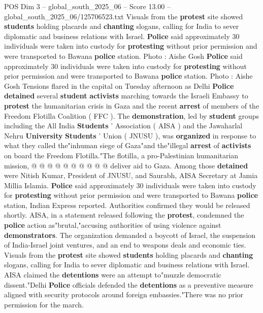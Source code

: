 \begin{textsample}{POS Dim 3 – global\_south\_2025\_06 – Score 13.00 – global\_south\_2025\_06/125706523.txt}  \label{ex:f3_pos_207}
Visuals from the \textbf{protest} site showed \textbf{students} holding placards and \textbf{chanting} slogans, calling for India to sever diplomatic and business relations with Israel. \textbf{Police} said approximately 30 individuals were taken into custody for \textbf{protesting} without prior permission and were transported to Bawana \textbf{police} station.
Photo : Aishe Gosh \textbf{Police} said approximately 30 individuals were taken into custody for \textbf{protesting} without prior permission and were transported to Bawana \textbf{police} station.
Photo : Aishe Gosh Tensions flared in the capital on Tuesday afternoon as Delhi \textbf{Police} \textbf{detained} several \textbf{student} \textbf{activists} marching towards the Israeli Embassy to \textbf{protest} the humanitarian crisis in Gaza and the recent \textbf{arrest} of members of the Freedom Flotilla Coalition ( FFC ).
The \textbf{demonstration}, led by \textbf{student} groups including the All India \textbf{Students} ' Association ( AISA ) and the Jawaharlal Nehru \textbf{University} \textbf{Students} ' Union ( JNUSU ), was \textbf{organized} in response to what they called the"inhuman siege of Gaza"and the"illegal \textbf{arrest} of \textbf{activists} on board the Freedom Flotilla."The flotilla, a pro-Palestinian humanitarian mission, @ @ @ @ @ @ @ @ @ @ deliver aid to Gaza.
Among those \textbf{detained} were Nitish Kumar, President of JNUSU, and Saurabh, AISA Secretary at Jamia Millia Islamia. \textbf{Police} said approximately 30 individuals were taken into custody for \textbf{protesting} without prior permission and were transported to Bawana \textbf{police} station, Indian Express reported.
Authorities confirmed they would be released shortly.
AISA, in a statement released following the \textbf{protest}, condemned the \textbf{police} action as"brutal,"accusing authorities of using violence against \textbf{demonstrators}.
The organization demanded a boycott of Israel, the suspension of India-Israel joint ventures, and an end to weapons deals and economic ties.
Visuals from the \textbf{protest} site showed \textbf{students} holding placards and \textbf{chanting} slogans, calling for India to sever diplomatic and business relations with Israel.
AISA claimed the \textbf{detentions} were an attempt to"muzzle democratic dissent."Delhi \textbf{Police} officials defended the \textbf{detentions} as a preventive measure aligned with security protocols around foreign embassies."There was no prior permission for the march.

\end{textsample}
